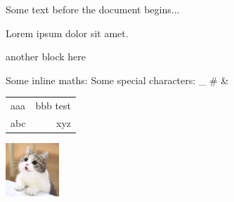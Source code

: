 Some text before the document begins...


    Lorem ipsum dolor sit amet. %



    { another block here }
    

    Some inline maths: %
    Some special characters: _ # &
    
    \begin{tabular}{lr}
        aaa & bbb { test } \\
        abc & xyz
    \end{tabular}
    
    \includegraphics[height = 2cm, width = 2cm]{./cat.jpg}
